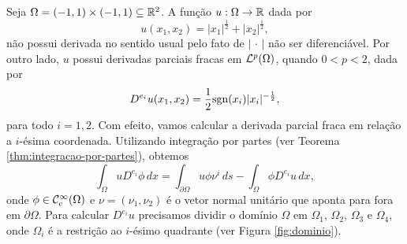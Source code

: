 \begin{ex}
    Seja $\Omega = (-1,1) \times (-1,1) \subseteq \mathbb{R}^2$. A função $u : \Omega \to \mathbb{R}$ dada por
    \[
        u(x_1,x_2) = |x_1|^{\frac{1}{2}} + |x_2|^{\frac{1}{2}},
    \]
    não possui derivada no sentido usual pelo fato de $|\,\cdot\,|$ não ser diferenciável.
    Por outro lado, $u$ possui derivadas parciais fracas em $\mathcal{L}^p(\Omega)$, quando $0 < p < 2$, dada por
    \[
        D^{e_i}u(x_1,x_2) = \frac{1}{2}\mathrm{sgn}(x_i) |x_i|^{-\frac{1}{2}},
    \]
    para todo $i = 1,2$.
    Com efeito, vamos calcular a derivada parcial fraca em relação a $i$-ésima coordenada. Utilizando integração por partes (ver Teorema \ref{thm:integracao-por-partes}), obtemos
    \begin{equation} \label{eq:derivada-fraca-exemplo-legal}
        \int_\Omega u D^{e_i} \phi \,dx = \int_{\partial\Omega} u \phi \nu^i \,ds - \int_\Omega \phi D^{e_i}u \,dx,
    \end{equation}
    onde $\phi \in \mathcal{C}^\infty_c(\Omega)$ e $\nu = (\nu_1, \nu_2)$ é o vetor normal unitário que aponta para fora em $\partial \Omega$.
    Para calcular $D^{e_i} u$ precisamos dividir o domínio $\Omega$ em $\Omega_1$, $\Omega_2$, $\Omega_3$ e $\Omega_4$, onde $\Omega_i$ é a restrição ao $i$-ésimo quadrante (ver Figura \ref{fig:dominio}).
    \begin{figure}[H]
        \centering
\end{figure}
\end{ex}
